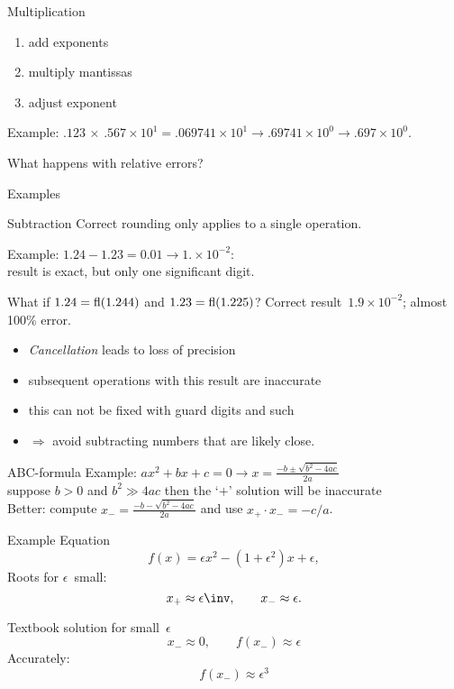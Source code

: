 \begin{numberedframe}{Multiplication}
  \begin{enumerate}
  \item add exponents
  \item multiply mantissas
  \item adjust exponent
  \end{enumerate}

Example: $.123\,\times\,.567\times10^1=.069741\times10^1\rightarrow
.69741\times10^0\rightarrow.697\times10^0$.

What happens with relative errors?
\end{numberedframe}

 {Examples}

\begin{numberedframe}{Subtraction}
Correct rounding only applies to a single operation.

Example: $1.24-1.23=0.01\rightarrow 1.\times 10^{-2}$:\\
result is exact, but only one significant digit.

What if $1.24=\mathop{\mathrm{fl}}(1.244)$ and $1.23=\mathop{\mathrm{fl}}(1.225)$? Correct
result~$1.9\times 10^{-2}$; almost 100\% error.
\begin{itemize}
\item \emph{Cancellation} leads to loss of precision
\item subsequent operations with this result are inaccurate
\item this can not be fixed with guard digits and such
\item $\Rightarrow$ avoid subtracting numbers that are likely close.
\end{itemize}
\end{numberedframe}

\begin{numberedframe}{ABC-formula}
  Example: $ax^2+bx+c=0\rightarrow x=\frac{-b\pm\sqrt{b^2-4ac}}{2a}$\\
  suppose $b>0$ and $b^2\gg 4ac$ then the `$+$' solution will be
  inaccurate\\
  Better: compute $x_-=\frac{-b-\sqrt{b^2-4ac}}{2a}$ and use $x_+\cdot
  x_-=-c/a$.
\end{numberedframe}

\begin{numberedframe}{Example}
Equation
\[ f(x) = \epsilon x^2 -(1+\epsilon^2) x + \epsilon, \]
Roots for $\epsilon$~small:
\[ x_+\approx \epsilon\inv,\qquad x_-\approx \epsilon. \]
  
Textbook solution for small~$\epsilon$
\[ x_-\approx 0, \qquad f(x_-)\approx\epsilon\]
Accurately: \[ f(x_-)\approx \epsilon^3 \]
\end{numberedframe}


